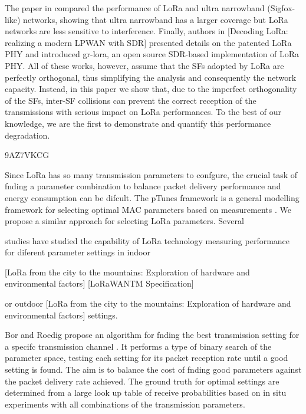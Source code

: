 The paper in \cite{reynders_range_2016} compared the performance of LoRa and ultra narrowband (Sigfox-like) networks,
	showing that ultra narrowband has a larger coverage but LoRa networks are less sensitive to interference.
Finally,
	authors in [Decoding LoRa:
	realizing a modern LPWAN with SDR] presented details on the patented LoRa PHY and introduced gr-lora,
	an open source SDR-based implementation of LoRa PHY.
All of these works,
	however,
	assume that the SFs adopted by LoRa are perfectly orthogonal,
	thus simplifying the analysis and consequently the network capacity.
Instead,
	in this paper we show that,
	due to the imperfect orthogonality of the SFs,
	inter-SF collisions can prevent the correct reception of the transmissions with serious impact on LoRa performances.
To the best of our knowledge,
	we are the first to demonstrate and quantify this performance degradation.

\cite{dix-matthews_lora_2018} 9AZ7VKCG

Since LoRa has so many transmission parameters to confgure,
	the crucial task of fnding a parameter combination to balance packet delivery performance and energy consumption can be difcult.
The pTunes framework is a general modelling framework for selecting optimal MAC parameters based on measurements \cite{zimmerling_ptunes_2012}.
We propose a similar approach for selecting LoRa parameters.
Several

studies have studied the capability of LoRa technology measuring performance for diferent parameter settings in indoor 

\cite{bor_lora_2017}
\cite{bor_lora_2016}
\cite{hutchison_data-aware_2013}
\cite{cardell-oliver_error_2012}
\cite{marco_cattani_experimental_2017}
[LoRa from the city to the mountains:
	Exploration of hardware and environmental factors] [LoRaWANTM Specification] \cite{marcelis_dare_2017}
\cite{petajajarvi_coverage_2015}
\cite{petajajarvi_evaluation_2017}

or outdoor \cite{augustin_study_2016}[LoRa from the city to the mountains:
	Exploration of hardware and environmental factors]\cite{marcelis_dare_2017} settings.

Bor and Roedig propose an algorithm for fnding the best transmission setting for a specifc transmission channel \cite{bor_lora_2017}.
It performs a type of binary search of the parameter space,
	testing each setting for its packet reception rate until a good setting is found.
The aim is to balance the cost of fnding good parameters against the packet delivery rate achieved.
The ground truth for optimal settings are determined from a large look up table of receive probabilities based on in situ experiments with all combinations of the transmission parameters.


